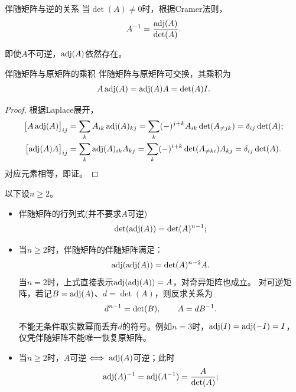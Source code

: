 \begin{theorem}
	{伴随矩阵与逆的关系}{}
	当$\det(A) \neq 0$时，根据Cramer法则，
	\begin{align}
		A^{-1} = \frac{\operatorname{adj}(A)}{\det(A)}.
	\end{align}
\end{theorem}
\begin{remark}
	即使$A$不可逆，$\operatorname{adj}(A)$依然存在。
\end{remark}
\begin{theorem}{伴随矩阵与原矩阵的乘积}{}
	伴随矩阵与原矩阵可交换，其乘积为
	\begin{align}
		A\operatorname{adj}(A) = \operatorname{adj}(A)A = \det(A)I.
	\end{align}
\end{theorem}
\begin{proof}
	根据Laplace展开，
	\begin{align*}
		\bigb{A\adj(A)}_{ij} &= \sum_{k}A_{ik}\adj(A)_{kj} = \sum_{k}(-)^{j+k}A_{ik}\det(A_{\neq jk}) = \delta_{ij}\det(A);\\
		\bigb{\adj(A)A}_{ij} &= \sum_{k}\adj(A)_{ik}A_{kj} = \sum_{k}(-)^{i+k}\det(A_{\neq ki})A_{kj} = \delta_{ij}\det(A).%
	\end{align*}
	对应元素相等，即证。
\end{proof}
\begin{corollary}
	以下设$n \geq 2$。
	\begin{itemize}
		\item %
		伴随矩阵的行列式(并不要求$A$可逆)
		\begin{align}
			\det(\operatorname{adj}(A)) = \det(A)^{n-1};
		\end{align}
		\item 当$n \geq 2$时，伴随矩阵的伴随矩阵满足：
		\begin{align}
			\operatorname{adj}(\operatorname{adj}(A)) = \det(A)^{n-2}A.
		\end{align}
		当$n = 2$时，上式直接表示$\operatorname{adj}(\operatorname{adj}(A)) = A$，对奇异矩阵也成立。
		对可逆矩阵，若记$B = \operatorname{adj}(A)$、$d = \det(A)$，则反求关系为
		\begin{equation}\label{eq:la-inverse-adjugate-recovery}
			d^{n-1} = \det(B),\qquad A = dB^{-1}.
		\end{equation}
		不能无条件取实数幂而丢弃$d$的符号。例如$n = 3$时，$\operatorname{adj}(I) = \operatorname{adj}(-I) = I$，仅凭伴随矩阵不能唯一恢复原矩阵。
		\item 当$n \geq 2$时，$A$可逆$\iff \operatorname{adj}(A)$可逆；此时
		\begin{align}
			\operatorname{adj}(A)^{-1} = \operatorname{adj}(A^{-1}) = \frac{A}{\det(A)};
		\end{align}
	\end{itemize}
\end{corollary}

